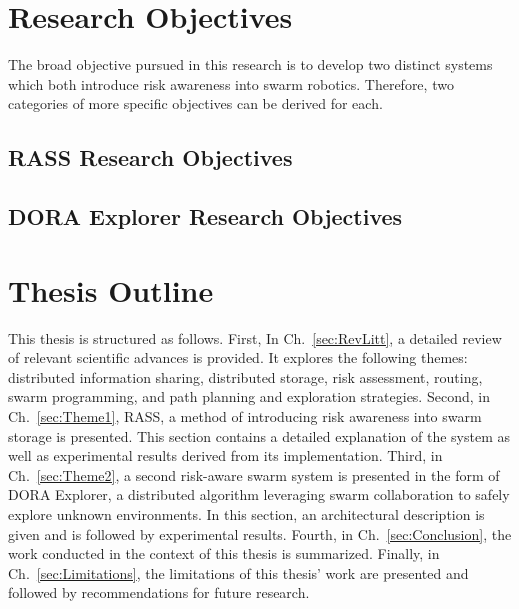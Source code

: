 \FloatBarrier


\section{Research Objectives}  %
The broad objective pursued in this research is to develop two distinct systems which both introduce risk awareness into swarm robotics. Therefore, two categories of more specific objectives can be derived for each.

\subsection{RASS Research Objectives}
\subsection{DORA Explorer Research Objectives}


\section{Thesis Outline}  %
This thesis is structured as follows. First, In Ch.~\ref{sec:RevLitt}, a detailed review of relevant scientific advances is provided. It explores the following themes: distributed information sharing, distributed storage, risk assessment, routing, swarm programming, and path planning and exploration strategies. Second, in Ch.~\ref{sec:Theme1}, RASS, a method of introducing risk awareness into swarm storage is presented. This section contains a detailed explanation of the system as well as experimental results derived from its implementation. Third, in Ch.~\ref{sec:Theme2}, a second risk-aware swarm system is presented in the form of DORA Explorer, a distributed algorithm leveraging swarm collaboration to safely explore unknown environments. In this section, an architectural description is given and is followed by experimental results. Fourth, in Ch.~\ref{sec:Conclusion}, the work conducted in the context of this thesis is summarized. Finally, in Ch.~\ref{sec:Limitations}, the limitations of this thesis' work are presented and followed by recommendations for future research.